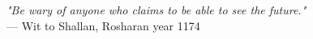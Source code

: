 \begin{flushright}
\emph{"Be wary of anyone who claims to be able to see the future."}\\
 — Wit to Shallan, Rosharan year 1174
\end{flushright}
